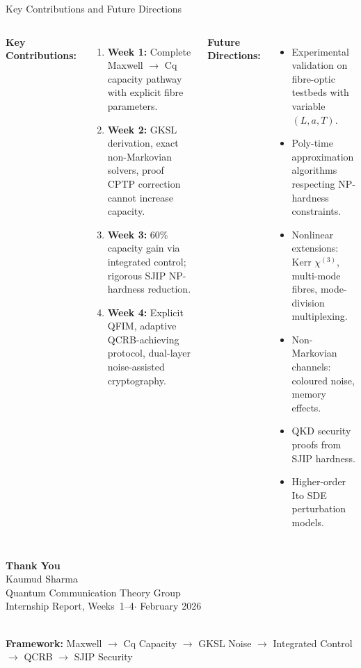 \documentclass[aspectratio=169,10pt]{beamer}
\begin{document}
\begin{frame}{Key Contributions and Future Directions}
\begin{columns}[T]
    \textbf{Key Contributions:}
    \begin{enumerate}
      \item \textbf{Week 1:} Complete Maxwell $\to$ Cq capacity
        pathway with explicit fibre parameters.
      \item \textbf{Week 2:} GKSL derivation, exact non-Markovian
        solvers, proof CPTP correction cannot increase capacity.
      \item \textbf{Week 3:} 60\% capacity gain via integrated
        control; rigorous SJIP NP-hardness reduction.
      \item \textbf{Week 4:} Explicit QFIM, adaptive QCRB-achieving
        protocol, dual-layer noise-assisted cryptography.
    \end{enumerate}

    \textbf{Future Directions:}
    \begin{itemize}
      \item Experimental validation on fibre-optic testbeds
        with variable $(L,a,T)$.
      \item Poly-time approximation algorithms respecting
        NP-hardness constraints.
      \item Nonlinear extensions: Kerr $\chi^{(3)}$, multi-mode
        fibres, mode-division multiplexing.
      \item Non-Markovian channels: coloured noise, memory
        effects.
      \item QKD security proofs from SJIP hardness.
      \item Higher-order Ito SDE perturbation models.
    \end{itemize}
\end{columns}
\end{frame}

{%
\begin{frame}[plain]
  \centering
  \vspace{1.5cm}
  {\LARGE\bfseries\color{deepblue}
    Thank You}\\[1.2cm]
  {\large Kaumud Sharma}\\[0.3cm]
  {\normalsize Quantum Communication Theory Group}\\[0.3cm]
  {\normalsize Internship Report, Weeks~1--4\quad$\cdot$\quad
    February 2026}\\[1.5cm]
  \\[0.8cm]
  {\small\color{textdark}
    \textbf{Framework:} Maxwell $\to$ Cq Capacity $\to$
    GKSL Noise $\to$ Integrated Control $\to$ QCRB $\to$
    SJIP Security}
\end{frame}
}
\end{document}
